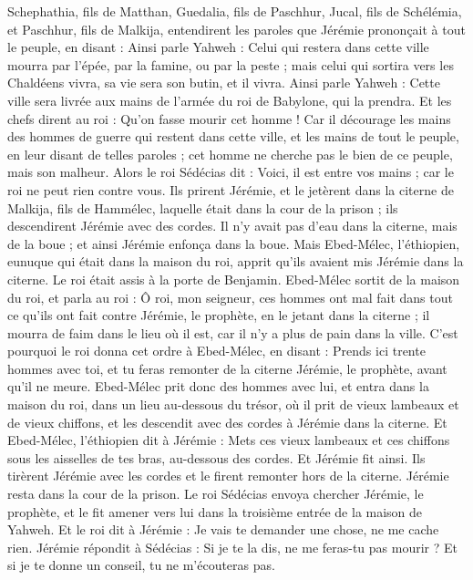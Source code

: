 \begin{multicols}{2}
\VerseOne{}Schephathia, fils de Matthan, Guedalia, fils de Paschhur, Jucal, fils de Schélémia, et Paschhur, fils de Malkija, entendirent les paroles que Jérémie prononçait à tout le peuple, en disant :
Ainsi parle Yahweh : Celui qui restera dans cette ville mourra par l'épée, par la famine, ou par la peste ; mais celui qui sortira vers les Chaldéens vivra, sa vie sera son butin, et il vivra.
Ainsi parle Yahweh : Cette ville sera livrée aux mains de l'armée du roi de Babylone, qui la prendra.
Et les chefs dirent au roi : Qu'on fasse mourir cet homme ! Car  il décourage les mains des hommes de guerre qui restent dans cette ville, et les mains de tout le peuple, en leur disant de telles paroles ; cet homme ne cherche pas le bien de ce peuple, mais son malheur.
Alors le roi Sédécias dit : Voici, il est entre vos mains ; car le roi ne peut rien contre vous.
Ils prirent Jérémie, et le jetèrent dans la citerne de Malkija, fils de Hammélec, laquelle était dans la cour de la prison ; ils descendirent Jérémie avec des cordes. Il n'y avait pas d'eau dans la citerne, mais de la boue ; et ainsi Jérémie enfonça dans la boue.
Mais Ebed-Mélec, l’éthiopien, eunuque qui était dans la maison du roi, apprit qu'ils avaient mis Jérémie dans la citerne. Le roi était assis à la porte de Benjamin.
Ebed-Mélec sortit de la maison du roi, et parla au roi :
Ô roi, mon seigneur, ces hommes ont mal fait dans tout ce qu’ils ont fait contre Jérémie, le prophète, en le jetant dans la citerne ;  il mourra de faim dans le lieu où il est, car il n'y a plus de pain dans la ville.
C'est pourquoi le roi donna cet ordre à Ebed-Mélec, en disant : Prends ici trente hommes avec toi, et tu feras remonter de la citerne Jérémie, le prophète, avant qu'il ne meure.
Ebed-Mélec prit donc des hommes avec lui, et entra dans la maison du roi, dans un lieu au-dessous du trésor, où il prit de vieux lambeaux et de vieux chiffons, et les descendit avec des cordes à Jérémie dans la citerne.
Et Ebed-Mélec, l’éthiopien dit à Jérémie : Mets ces vieux lambeaux et ces chiffons sous les aisselles de tes bras, au-dessous des cordes. Et Jérémie fit ainsi.
Ils tirèrent Jérémie avec les cordes et le firent remonter hors de la citerne. Jérémie resta dans la cour de la prison.
Le roi Sédécias envoya chercher Jérémie, le prophète, et le fit amener vers lui dans la troisième entrée de la maison de Yahweh. Et le roi dit à Jérémie : Je vais te demander une chose, ne me cache rien.
Jérémie répondit à Sédécias : Si je te la dis, ne me feras-tu pas mourir ? Et si je te donne un conseil, tu ne m'écouteras pas.

\end{multicols}
